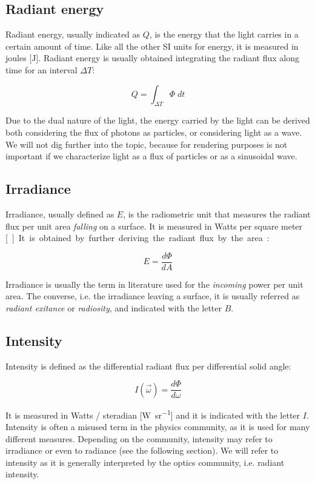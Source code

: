 \subsection{Radiant energy}
Radiant energy, usually indicated as $Q$, is the energy that the light carries in a certain amount of time. Like all the other SI units for energy, it is measured in joules [\si{\joule}]. Radiant energy is usually obtained integrating the radiant flux along time for an interval $\Delta T$:

$$
Q = \int_{\Delta T} \Phi \; dt
$$

Due to the dual nature of the light, the energy carried by the light can be derived both considering the flux of photons as particles, or considering light as a wave. We will not dig further into the topic, because for rendering purposes is not important if we characterize light as a flux of particles or as a sinusoidal wave.

\subsection{Irradiance}

Irradiance, usually defined as $E$, is the radiometric unit that measures the radiant flux per unit area \emph{falling} on a surface. It is measured in Watts per square meter [\si{\watt\per\meter\square}]. It is obtained by further deriving the radiant flux by the area:

$$
E = \frac{d\Phi}{dA}
$$

Irradiance is usually the term in literature used for the \emph{incoming} power per unit area. The converse, i.e. the irradiance leaving a surface, it is usually referred as \emph{radiant exitance} or \emph{radiosity}, and indicated with the letter $B$.
 
\subsection{Intensity}
Intensity is defined as the differential radiant flux per differential solid angle:

$$
I(\vec{\omega}) = \frac{d \Phi}{d \omega}
$$

It is measured in Watts / steradian [\si{\watt\per\steradian}] and it is indicated with the letter $I$. Intensity is often a misused term in the physics community, as it is used for many different measures. Depending on the community, intensity may refer to irradiance or even to radiance (see the following section). We will refer to intensity as it is generally interpreted by the optics community, i.e. radiant intensity. 

